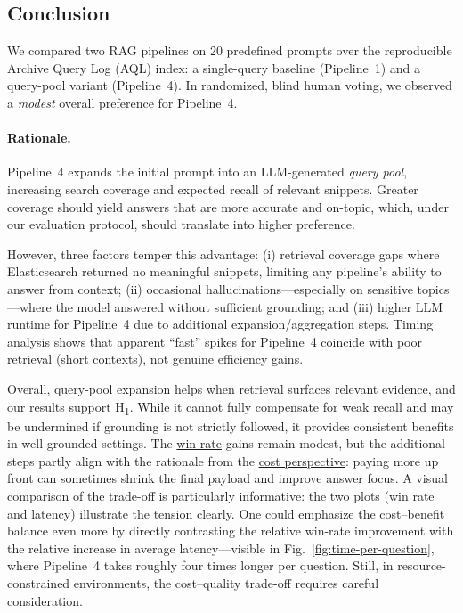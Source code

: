 \documentclass[manuscript,screen]{acmart}
\begin{document}
\begin{CCSXML}
\section{Conclusion}
\label{sec:conclusion}

We compared two RAG pipelines on 20 predefined prompts over the reproducible
Archive Query Log (AQL) index: a single-query baseline (Pipeline~1) and a
query-pool variant (Pipeline~4). In randomized, blind human voting, we observed
a \emph{modest} overall preference for Pipeline~4. 

\paragraph{Rationale.}
Pipeline~4 expands the initial prompt into an LLM-generated \emph{query pool}, 
increasing search coverage and expected recall of relevant snippets. Greater coverage 
should yield answers that are more accurate and on-topic, which, under our evaluation protocol, 
should translate into higher preference.

However, three factors temper this advantage: 
\newline(i) retrieval coverage gaps where Elasticsearch returned no meaningful snippets, limiting any pipeline’s ability to answer from context;  
\newline(ii) occasional hallucinations—especially on sensitive topics—where the model answered without sufficient grounding; and  
\newline(iii) higher LLM runtime for Pipeline~4 due to additional expansion/aggregation steps. Timing analysis shows
that apparent “fast” spikes for Pipeline~4 coincide with poor retrieval (short contexts), not genuine efficiency gains.

Overall, query-pool expansion helps when retrieval surfaces relevant evidence, and our results support \hyperref[hyp:H1]{H\textsubscript{1}}. 
While it cannot fully compensate for \hyperref[retrieval-coverage-limits]{weak recall} and may be undermined if grounding is not strictly followed, it provides consistent benefits in well-grounded settings. 
The \hyperref[fig:winrate-overall]{win-rate} gains remain modest, but the additional steps partly align with the rationale from the \hyperref[cost-perspective]{cost perspective}: paying more up front can sometimes shrink the final payload and improve answer focus. 
A visual comparison of the trade-off is particularly informative: the two plots (win rate and latency) illustrate the tension clearly. One could emphasize the cost–benefit balance even more by directly contrasting the relative win-rate improvement with the relative increase in average latency—visible in Fig.~\ref{fig:time-per-question}, where Pipeline~4 takes roughly four times longer per question. 
Still, in resource-constrained environments, the cost–quality trade-off requires careful consideration.



\end{CCSXML}
\end{document}
